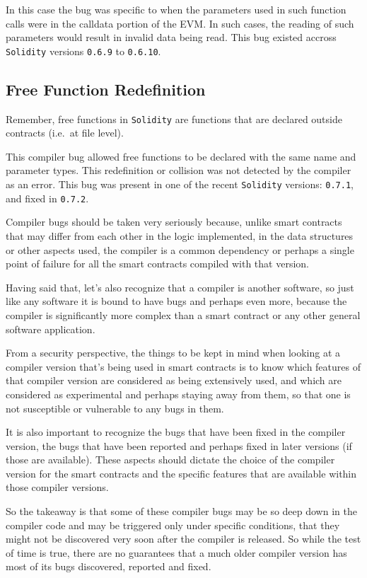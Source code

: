 In this case the bug was specific to when the parameters used in such
function calls were in the calldata portion of the EVM. In such cases,
the reading of such parameters would result in invalid data being read.
This bug existed accross \texttt{Solidity} versions \texttt{0.6.9} to
\texttt{0.6.10}.

\subsection{Free Function
Redefinition}\label{free-function-redefinition}

Remember, free functions in \texttt{Solidity} are functions that are
declared outside contracts (i.e.~at file level).

This compiler bug allowed free functions to be declared with the same
name and parameter types. This redefinition or collision was not
detected by the compiler as an error. This bug was present in one of the
recent \texttt{Solidity} versions: \texttt{0.7.1}, and fixed in
\texttt{0.7.2}.

Compiler bugs should be taken very seriously because, unlike smart
contracts that may differ from each other in the logic implemented, in
the data structures or other aspects used, the compiler is a common
dependency or perhaps a single point of failure for all the smart
contracts compiled with that version.

Having said that, let's also recognize that a compiler is another
software, so just like any software it is bound to have bugs and perhaps
even more, because the compiler is significantly more complex than a
smart contract or any other general software application.

From a security perspective, the things to be kept in mind when looking
at a compiler version that's being used in smart contracts is to know
which features of that compiler version are considered as being
extensively used, and which are considered as experimental and perhaps
staying away from them, so that one is not susceptible or vulnerable to
any bugs in them.

It is also important to recognize the bugs that have been fixed in the
compiler version, the bugs that have been reported and perhaps fixed in
later versions (if those are available). These aspects should dictate
the choice of the compiler version for the smart contracts and the
specific features that are available within those compiler versions.

So the takeaway is that some of these compiler bugs may be so deep down
in the compiler code and may be triggered only under specific
conditions, that they might not be discovered very soon after the
compiler is released. So while the test of time is true, there are no
guarantees that a much older compiler version has most of its bugs
discovered, reported and fixed.
